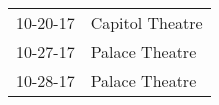 \begin{supertabular}{p{0.07\textwidth}p{0.23\textwidth}}
 10-20-17 &  Capitol Theatre \\
 10-27-17 &   Palace Theatre \\
 10-28-17 &   Palace Theatre \\
\end{supertabular}
